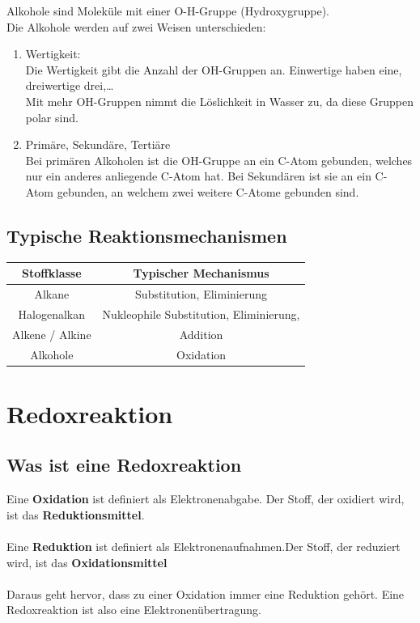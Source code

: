 \documentclass[a4paper]{article}
\begin{document}
Alkohole sind Moleküle mit einer O-H-Gruppe (Hydroxygruppe).\\
Die Alkohole werden auf zwei Weisen unterschieden:
\begin{enumerate}
    \item Wertigkeit:\\
            Die Wertigkeit gibt die Anzahl der OH-Gruppen an. Einwertige haben eine, dreiwertige drei,\dots\\
            Mit mehr OH-Gruppen nimmt die Löslichkeit in Wasser zu, da diese Gruppen polar sind.
    \item Primäre, Sekundäre, Tertiäre\\
            Bei primären Alkoholen ist die OH-Gruppe an ein C-Atom gebunden, welches nur ein anderes anliegende C-Atom hat.
            Bei Sekundären ist sie an ein C-Atom gebunden, an welchem zwei weitere C-Atome gebunden sind.\\
\end{enumerate}


\subsection{Typische Reaktionsmechanismen}
\begin{tabular}{|c|c|} \hline
    Stoffklasse &Typischer Mechanismus \\\hline
    Alkane &Substitution, Eliminierung\\
    Halogenalkan &Nukleophile Substitution, Eliminierung,\\
    Alkene / Alkine &Addition\\
    Alkohole &Oxidation
\end{tabular}



\section{Redoxreaktion}

\subsection{Was ist eine Redoxreaktion}
Eine \textbf{Oxidation} ist definiert als Elektronenabgabe. Der Stoff, der oxidiert wird, ist das \textbf{Reduktionsmittel}.\\\\
Eine \textbf{Reduktion} ist definiert als Elektronenaufnahmen.Der Stoff, der reduziert wird, ist das \textbf{Oxidationsmittel}\\\\
Daraus geht hervor, dass zu einer Oxidation immer eine Reduktion gehört. Eine Redoxreaktion ist also eine Elektronenübertragung.\\\\
\end{document}

